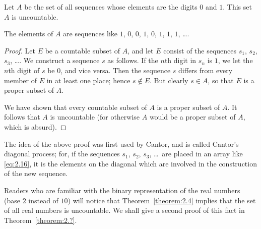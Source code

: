 \begin{theorem}\label{theorem:2.4}
    Let \(A\) be the set of all sequences whose elements are the digits \(0\) and \(1\). This set \(A\) is uncountable.
\end{theorem}

The elements of \(A\) are sequences like \(1\), \(0\), \(0\), \(1\), \(0\), \(1\), \(1\), \(1\), \ldots.

\begin{proof}
    Let \(E\) be a countable subset of \(A\), and let \(E\) consist of the sequences \(s_1\), \(s_2\), \(s_3\), \ldots. We construct a sequence \(s\) as follows. If the \(n\)th digit in \(s_n\) is \(1\), we let the \(n\)th digit of \(s\) be \(0\), and vice versa. Then the sequence \(s\) differs from every member of \(E\) in at least one place; hence \(s\notin E\). But clearly \(s\in A\), so that \(E\) is a proper subset of \(A\).

    We have shown that every countable subset of \(A\) is a proper subset of \(A\). It follows that \(A\) is uncountable (for otherwise \(A\) would be a proper subset of \(A\), which is absurd).
\end{proof}

The idea of the above proof was first used by Cantor, and is called Cantor's diagonal process; for, if the sequences \(s_1\), \(s_2\), \(s_3\), \ldots\ are placed in an array like \eqref{eq:2.16}, it is the elements on the diagonal which are involved in the construction of the new sequence.

Readers who are familiar with the binary representation of the real numbers (base \(2\) instead of \(10\)) will notice that Theorem~\ref{theorem:2.4} implies that the set of all real numbers is uncountable. We shall give a second proof of this fact in Theorem~\ref{theorem:2.?}.
